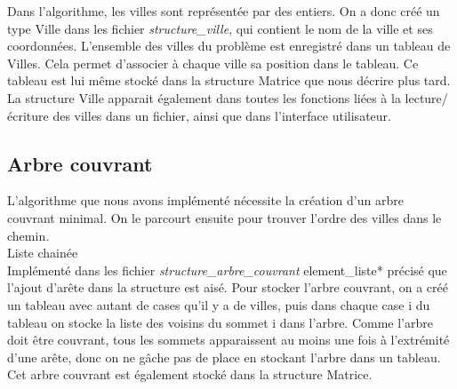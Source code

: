 \documentclass[a4paper,11pt]{article}
\begin{document}
Dans l'algorithme, les villes sont représentée par des entiers. On a donc créé un type \textsf{Ville} dans les fichier \emph{structure\_ville}, qui contient le nom de la ville et ses coordonnées. L'ensemble des villes du problème est enregistré dans un tableau de Villes. Cela permet d'associer à chaque ville sa position dans le tableau. Ce tableau est lui même stocké dans la structure \textsf{Matrice} que nous décrire plus tard.\\
La structure Ville apparait également dans toutes les fonctions liées à la lecture/écriture des villes dans un fichier, ainsi que dans l'interface utilisateur.\\

\subsection{Arbre couvrant}

L'algorithme que nous avons implémenté nécessite la création d'un arbre couvrant minimal. On le parcourt ensuite pour trouver l'ordre des villes dans le chemin.\\
{\Large Liste chainée}\\
Implémenté dans les fichier \emph{structure\_arbre\_couvrant}
\textsf{element\_liste*}
précisé que l'ajout d'arête dans la structure est aisé.
Pour stocker l'arbre couvrant, on a créé un tableau avec autant de cases qu'il y a de villes, puis dans chaque case i du tableau on stocke la liste des voisins du sommet i dans l'arbre. Comme l'arbre doit être couvrant, tous les sommets apparaissent au moins une fois à l'extrémité d'une arête, donc on ne gâche pas de place en stockant l'arbre dans un tableau.\\
Cet arbre couvrant est également stocké dans la structure Matrice.\\
\end{document}
